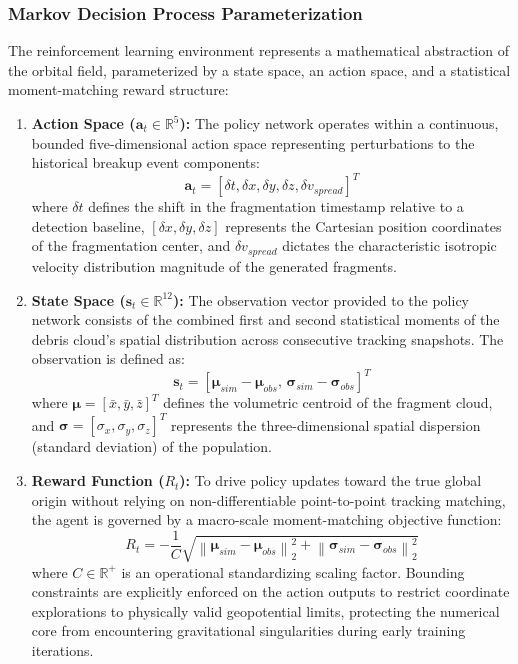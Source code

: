 \documentclass[letterpaper, preprint, 11pt]{AAS}
\begin{document}
\subsubsection{Markov Decision Process Parameterization}
The reinforcement learning environment represents a mathematical abstraction of the orbital field, parameterized by a state space, an action space, and a statistical moment-matching reward structure:
\begin{enumerate}
    \item \textbf{Action Space ($\mathbf{a}_t \in \mathbb{R}^5$):} The policy network operates within a continuous, bounded five-dimensional action space representing perturbations to the historical breakup event components:
    \begin{equation}
        \mathbf{a}_t = \left[ \delta t, \delta x, \delta y, \delta z, \delta v_{spread} \right]^T
        \label{eq:ppo_action_space}
    \end{equation}
    where $\delta t$ defines the shift in the fragmentation timestamp relative to a detection baseline, $[\delta x, \delta y, \delta z]$ represents the Cartesian position coordinates of the fragmentation center, and $\delta v_{spread} $ dictates the characteristic isotropic velocity distribution magnitude of the generated fragments.
    
    \item \textbf{State Space ($\mathbf{s}_t \in \mathbb{R}^{12}$):} The observation vector provided to the policy network consists of the combined first and second statistical moments of the debris cloud's spatial distribution across consecutive tracking snapshots. The observation is defined as:
    \begin{equation}
        \mathbf{s}_t = \left[ \boldsymbol{\mu}_{sim} - \boldsymbol{\mu}_{obs}, \, \boldsymbol{\sigma}_{sim} - \boldsymbol{\sigma}_{obs} \right]^T
        \label{eq:ppo_state_space}
    \end{equation}
    where $\boldsymbol{\mu} = [\bar{x}, \bar{y}, \bar{z}]^T$ defines the volumetric centroid of the fragment cloud, and $\boldsymbol{\sigma} = [\sigma_x, \sigma_y, \sigma_z]^T$ represents the three-dimensional spatial dispersion (standard deviation) of the population.
    
    \item \textbf{Reward Function ($R_t$):} To drive policy updates toward the true global origin without relying on non-differentiable point-to-point tracking matching, the agent is governed by a macro-scale moment-matching objective function:
    \begin{equation}
        R_t = - \frac{1}{C} \sqrt{ \left\| \boldsymbol{\mu}_{sim} - \boldsymbol{\mu}_{obs} \right\|_2^2 + \left\| \boldsymbol{\sigma}_{sim} - \boldsymbol{\sigma}_{obs} \right\|_2^2 }
        \label{eq:ppo_reward}
    \end{equation}
    where $C \in \mathbb{R}^+$ is an operational standardizing scaling factor. Bounding constraints are explicitly enforced on the action outputs to restrict coordinate explorations to physically valid geopotential limits, protecting the numerical core from encountering gravitational singularities during early training iterations.
\end{enumerate}
\end{document}
